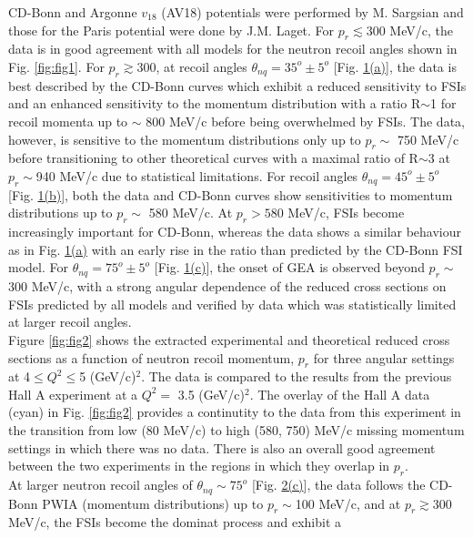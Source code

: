 CD-Bonn and Argonne $v_{18}$\cite{PhysRevC.51.38} (AV18) potentials were performed by M. Sargsian and those for the Paris potential were done by J.M. Laget. For $p_{r}\lesssim 300$ MeV/c, the data is
in good agreement with all models for the neutron recoil angles shown in Fig. \ref{fig:fig1}. For $p_{r}\gtrsim 300$, at recoil angles $\theta_{nq} = 35^{o}\pm5^{o}$ [Fig. \hyperref[fig:fig1]{1(a)}],
the data is best described by the CD-Bonn curves which exhibit a reduced sensitivity to FSIs and an enhanced sensitivity to the momentum distribution with a ratio R$\sim$1 for recoil momenta
up to $\sim$ 800 MeV/c before being overwhelmed by FSIs. The data, however, is sensitive to the momentum distributions only up to $p_{r}\sim$ 750 MeV/c before transitioning to other theoretical curves
with a maximal ratio of R$\sim$3 at $p_{r}\sim$940 MeV/c due to statistical limitations. For recoil angles $\theta_{nq} = 45^{o}\pm5^{o}$ [Fig. \hyperref[fig:fig1]{1(b)}], both the data and
CD-Bonn curves show sensitivities to momentum distributions up to $p_{r}\sim$ 580 MeV/c. At $p_{r}>580$ MeV/c, FSIs become increasingly important for CD-Bonn, whereas the data shows
a similar behaviour as in Fig. \hyperref[fig:fig1]{1(a)} with an early rise in the ratio than predicted by the CD-Bonn FSI model. For $\theta_{nq} = 75^{o}\pm5^{o}$ [Fig. \hyperref[fig:fig1]{1(c)}], the
onset of GEA is observed beyond $p_{r}\sim$ 300 MeV/c, with a strong angular dependence of the reduced cross sections on FSIs predicted by all models and verified by data which was statistically limited
at larger recoil angles. \\
\indent Figure \ref{fig:fig2} shows the extracted experimental and theoretical reduced cross sections as a function of neutron recoil momentum, $p_{r}$ for three angular settings at 4$\leq Q^{2} \leq$5
(GeV/c)$^{2}$. The data is compared to the results from the previous Hall A experiment\cite{PhysRevLett.107.262501} at a $Q^{2}=$ 3.5 (GeV/c)$^{2}$.  The overlay of the Hall A data (cyan) in Fig. \ref{fig:fig2}
provides a continutity to the data from this experiment in the transition from low (80 MeV/c) to high (580, 750) MeV/c missing momentum settings in which there
was no data. There is also an overall good agreement between the two experiments in the regions in which they overlap in $p_{r}$. \\
\indent At larger neutron recoil angles of $\theta_{nq}\sim75^{o}$ [Fig. \hyperref[fig:fig2]{2(c)}], the data follows the CD-Bonn PWIA (momentum distributions) up to $p_{r}\sim $100 MeV/c, and at $p_{r}\gtrsim$300 MeV/c, the FSIs become the dominat process and exhibit a
